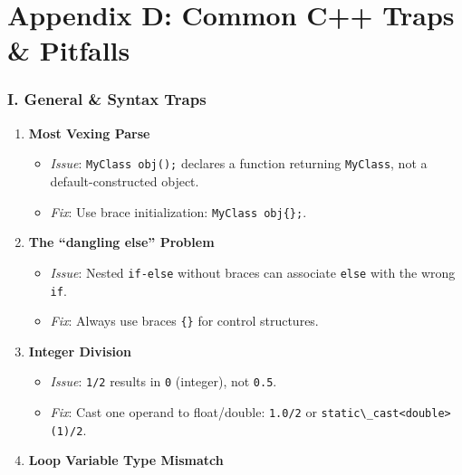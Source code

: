 \hypertarget{appendix-d-common-c-traps-pitfalls}{%
\section{Appendix D: Common C++ Traps \&
Pitfalls}\label{appendix-d-common-c-traps-pitfalls}}

\hypertarget{i.-general-syntax-traps}{%
\subsubsection{I. General \& Syntax
Traps}\label{i.-general-syntax-traps}}

\begin{enumerate}
\def\labelenumi{\arabic{enumi}.}
\tightlist
\item
  \textbf{Most Vexing Parse}

  \begin{itemize}
  \tightlist
  \item
    \emph{Issue}: \passthrough{\lstinline!MyClass obj();!} declares a
    function returning \passthrough{\lstinline!MyClass!}, not a
    default-constructed object.
  \item
    \emph{Fix}: Use brace initialization:
    \passthrough{\lstinline!MyClass obj\{\};!}.
  \end{itemize}
\item
  \textbf{The ``dangling else'' Problem}

  \begin{itemize}
  \tightlist
  \item
    \emph{Issue}: Nested \passthrough{\lstinline!if-else!} without
    braces can associate \passthrough{\lstinline!else!} with the wrong
    \passthrough{\lstinline!if!}.
  \item
    \emph{Fix}: Always use braces \passthrough{\lstinline!\{\}!} for
    control structures.
  \end{itemize}
\item
  \textbf{Integer Division}

  \begin{itemize}
  \tightlist
  \item
    \emph{Issue}: \passthrough{\lstinline!1/2!} results in
    \passthrough{\lstinline!0!} (integer), not
    \passthrough{\lstinline!0.5!}.
  \item
    \emph{Fix}: Cast one operand to float/double:
    \passthrough{\lstinline!1.0/2!} or
    \passthrough{\lstinline!static\_cast<double>(1)/2!}.
  \end{itemize}
\item
  \textbf{Loop Variable Type Mismatch}


\end{enumerate}
